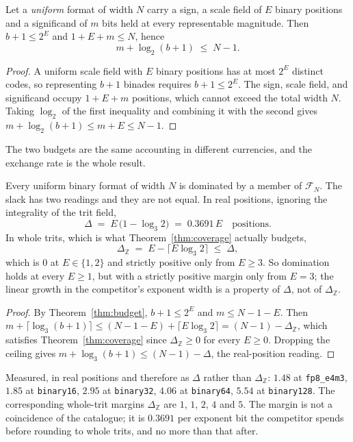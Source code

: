 \begin{theorem}
\label{thm:budget}
Let a \emph{uniform} format of width $N$ carry a sign, a scale field of $E$ binary
positions and a significand of $m$ bits held at every representable magnitude.
Then $b+1 \le 2^{E}$ and $1+E+m \le N$, hence
\[
  m + \log_2(b+1) \;\le\; N-1 .
\]
\end{theorem}
\begin{proof}
A uniform scale field with $E$ binary positions has at most $2^{E}$ distinct
codes, so representing $b+1$ binades requires $b+1\leq2^E$.  The sign, scale
field, and significand occupy $1+E+m$ positions, which cannot exceed the total
width $N$.  Taking $\log_2$ of the first inequality and combining it with the
second gives
$ m+\log_2(b+1)\leq m+E\leq N-1$.
\end{proof}

The two budgets are the same accounting in different currencies, and the exchange
rate is the whole result.

\begin{corollary}
\label{cor:slack}
Every uniform binary format of width $N$ is dominated by a member of
$\mathcal{F}_N$. The slack has two readings and they are not equal. In real
positions, ignoring the integrality of the trit field,
\[
  \Delta \;=\; E\,\bigl(1 - \log_3 2\bigr) \;=\; 0.3691\,E \quad\text{positions}.
\]
In whole trits, which is what Theorem~\ref{thm:coverage} actually budgets,
\[
  \Delta_{\mathbb{Z}} \;=\; E - \bigl\lceil E\log_3 2 \bigr\rceil
  \;\le\; \Delta ,
\]
which is $0$ at $E \in \{1,2\}$ and strictly positive only from $E \ge 3$. So
domination holds at every $E \ge 1$, but with a strictly positive margin only from
$E = 3$; the linear growth in the competitor's exponent width is a property of
$\Delta$, not of $\Delta_{\mathbb{Z}}$.
\end{corollary}
\begin{proof}
By Theorem~\ref{thm:budget}, $b+1 \le 2^E$ and $m \le N-1-E$. Then
$m + \lceil\log_3(b+1)\rceil \le (N-1-E) + \lceil E\log_3 2\rceil
= (N-1) - \Delta_{\mathbb{Z}}$, which satisfies Theorem~\ref{thm:coverage} since
$\Delta_{\mathbb{Z}} \ge 0$ for every $E \ge 0$. Dropping the ceiling gives
$m + \log_3(b+1) \le (N-1) - \Delta$, the real-position reading.
\end{proof}

Measured, in real positions and therefore as $\Delta$ rather than
$\Delta_{\mathbb{Z}}$: $1.48$ at \texttt{fp8\_e4m3}, $1.85$ at
\texttt{binary16}, $2.95$ at \texttt{binary32}, $4.06$ at \texttt{binary64},
$5.54$ at \texttt{binary128}. The corresponding whole-trit margins
$\Delta_{\mathbb{Z}}$ are $1$, $1$, $2$, $4$ and $5$. The margin is not a
coincidence of the catalogue; it is $0.3691$ per exponent bit the competitor
spends before rounding to whole trits, and no more than that after.

